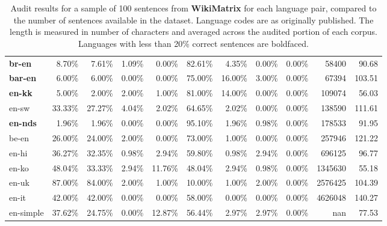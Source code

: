 \begin{table*}[hbt!]
{\begin{tabular}{l|rrrr|rrrr|rr}
            \textbf{br-en}   & 8.70\%  & 7.61\%  & 1.09\% & 0.00\%  & 82.61\% & 4.35\%  & 0.00\% & 0.00\% & 58400        & 90.68             \\
            \textbf{bar-en}  & 6.00\%  & 6.00\%  & 0.00\% & 0.00\%  & 75.00\% & 16.00\% & 3.00\% & 0.00\% & 67394        & 103.51            \\
            \textbf{en-kk}   & 5.00\%  & 2.00\%  & 2.00\% & 1.00\%  & 81.00\% & 14.00\% & 0.00\% & 0.00\% & 109074       & 56.03             \\
            en-sw            & 33.33\% & 27.27\% & 4.04\% & 2.02\%  & 64.65\% & 2.02\%  & 0.00\% & 0.00\% & 138590       & 111.61            \\
            \textbf{en-nds}  & 1.96\%  & 1.96\%  & 0.00\% & 0.00\%  & 95.10\% & 1.96\%  & 0.98\% & 0.00\% & 178533       & 91.95             \\
            be-en            & 26.00\% & 24.00\% & 2.00\% & 0.00\%  & 73.00\% & 1.00\%  & 0.00\% & 0.00\% & 257946       & 121.22            \\
            en-hi            & 36.27\% & 32.35\% & 0.98\% & 2.94\%  & 59.80\% & 0.98\%  & 2.94\% & 0.00\% & 696125       & 96.77             \\
            en-ko            & 48.04\% & 33.33\% & 2.94\% & 11.76\% & 48.04\% & 2.94\%  & 0.98\% & 0.00\% & 1345630      & 55.18             \\
            en-uk            & 87.00\% & 84.00\% & 2.00\% & 1.00\%  & 10.00\% & 1.00\%  & 2.00\% & 0.00\% & 2576425      & 104.39            \\
            en-it            & 42.00\% & 42.00\% & 0.00\% & 0.00\%  & 58.00\% & 0.00\%  & 0.00\% & 0.00\% & 4626048      & 140.27            \\
            en-simple        & 37.62\% & 24.75\% & 0.00\% & 12.87\% & 56.44\% & 2.97\%  & 2.97\% & 0.00\% & nan          & 77.53             \\
            \bottomrule
        \end{tabular}%
    }
    \caption{Audit results for a sample of 100 sentences from \textbf{WikiMatrix} for each language pair, compared to the number of sentences available in the dataset. Language codes are as originally published. The length is measured in number of characters and averaged across the audited portion of each corpus. Languages with less than 20\% correct sentences are boldfaced.}

    \label{tab:wikimatrix-full}
\end{table*}


